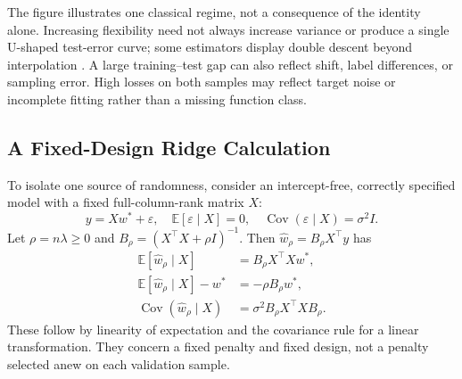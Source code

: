 \par\addvspace{\intextsep}\noindent\begin{minipage}{\linewidth}
\centering
{}
\label{fig:bias-variance}
\end{minipage}\par\addvspace{\intextsep}

The figure illustrates one classical regime, not a consequence of the identity alone. Increasing flexibility need not always increase variance or produce a single U-shaped test-error curve; some estimators display double descent beyond interpolation \citep{belkin2019double}. A large training--test gap can also reflect shift, label differences, or sampling error. High losses on both samples may reflect target noise or incomplete fitting rather than a missing function class.

\subsection{A Fixed-Design Ridge Calculation}

To isolate one source of randomness, consider an intercept-free, correctly specified model with a fixed full-column-rank matrix $X$:
\[
y=Xw^*+\varepsilon,
\quad \mathbb E[\varepsilon\mid X]=0,
\quad \operatorname{Cov}(\varepsilon\mid X)=\sigma^2I.
\]
Let $\rho=n\lambda\geq0$ and $B_\rho=(X^\top X+\rho I)^{-1}$. Then $\hat w_\rho=B_\rho X^\top y$ has
\begin{align*}
\mathbb E[\hat w_\rho\mid X]&=B_\rho X^\top Xw^*,\\
\mathbb E[\hat w_\rho\mid X]-w^*&=-\rho B_\rho w^*,\\
\operatorname{Cov}(\hat w_\rho\mid X)&=\sigma^2B_\rho X^\top X B_\rho.
\end{align*}
These follow by linearity of expectation and the covariance rule for a linear transformation. They concern a fixed penalty and fixed design, not a penalty selected anew on each validation sample.

